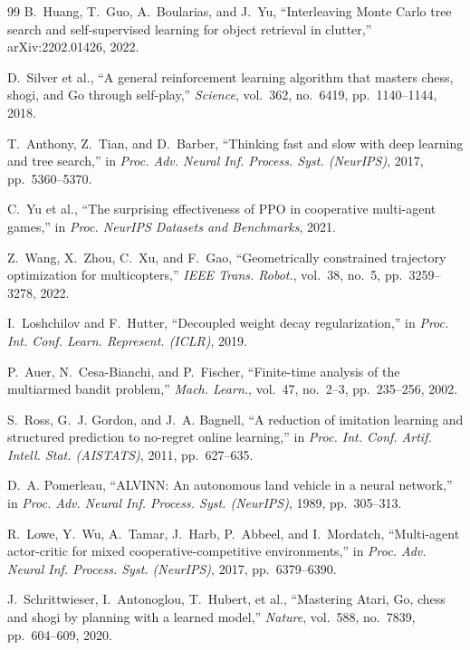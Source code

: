 \documentclass[letterpaper,10pt,conference]{ieeeconf}
\begin{document}
\begin{thebibliography}{99}
B.~Huang, T.~Guo, A.~Boularias, and J.~Yu, ``Interleaving Monte Carlo
tree search and self-supervised learning for object retrieval in clutter,''
arXiv:2202.01426, 2022.

D.~Silver et al., ``A general reinforcement learning algorithm that
masters chess, shogi, and Go through self-play,'' \emph{Science},
vol.~362, no.~6419, pp.~1140--1144, 2018.

T.~Anthony, Z.~Tian, and D.~Barber, ``Thinking fast and slow with deep
learning and tree search,'' in \emph{Proc. Adv. Neural Inf. Process.
Syst. (NeurIPS)}, 2017, pp.~5360--5370.

C.~Yu et al., ``The surprising effectiveness of PPO in cooperative
multi-agent games,'' in \emph{Proc. NeurIPS Datasets and Benchmarks},
2021.

Z.~Wang, X.~Zhou, C.~Xu, and F.~Gao, ``Geometrically constrained
trajectory optimization for multicopters,'' \emph{IEEE Trans. Robot.},
vol.~38, no.~5, pp.~3259--3278, 2022.

I.~Loshchilov and F.~Hutter, ``Decoupled weight decay regularization,''
in \emph{Proc. Int. Conf. Learn. Represent. (ICLR)}, 2019.

P.~Auer, N.~Cesa-Bianchi, and P.~Fischer, ``Finite-time analysis of the
multiarmed bandit problem,'' \emph{Mach. Learn.}, vol.~47, no.~2--3,
pp.~235--256, 2002.

S.~Ross, G.~J. Gordon, and J.~A. Bagnell, ``A reduction of imitation
learning and structured prediction to no-regret online learning,'' in
\emph{Proc. Int. Conf. Artif. Intell. Stat. (AISTATS)}, 2011,
pp.~627--635.

D.~A. Pomerleau, ``ALVINN: An autonomous land vehicle in a neural
network,'' in \emph{Proc. Adv. Neural Inf. Process. Syst. (NeurIPS)},
1989, pp.~305--313.

R.~Lowe, Y.~Wu, A.~Tamar, J.~Harb, P.~Abbeel, and I.~Mordatch,
``Multi-agent actor-critic for mixed cooperative-competitive
environments,'' in \emph{Proc. Adv. Neural Inf. Process. Syst.
(NeurIPS)}, 2017, pp.~6379--6390.

J.~Schrittwieser, I.~Antonoglou, T.~Hubert, et al., ``Mastering Atari,
Go, chess and shogi by planning with a learned model,'' \emph{Nature},
vol.~588, no.~7839, pp.~604--609, 2020.


\end{thebibliography}
\end{document}
